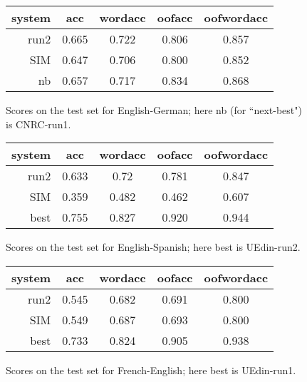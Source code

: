 \documentclass[11pt]{article}
\begin{document}
\begin{figure}[t]
  \begin{center}
  \begin{tabular}{|r|c|c|c|c|}
    \hline
    system & acc      & wordacc  & oofacc & oofwordacc \\
    \hline
    run2  &  0.665 & 0.722  &  0.806  & 0.857 \\
    SIM    &  0.647 & 0.706 & 0.800 & 0.852 \\
    nb     &  0.657   & 0.717   & 0.834 & 0.868    \\
    \hline
  \end{tabular}
  \end{center}
\caption{Scores on the test set for English-German; here nb (for
``next-best") is CNRC-run1.}
\label{fig:theresults-en-de}
\end{figure}

\begin{figure}[t]
  \begin{center}
  \begin{tabular}{|r|c|c|c|c|}
    \hline
    system & acc      & wordacc  & oofacc & oofwordacc \\
    \hline
    run2  &  0.633 & 0.72 & 0.781 & 0.847 \\
    SIM    &  0.359 &  0.482 & 0.462 & 0.607 \\
    best   &  0.755 & 0.827   & 0.920  & 0.944 \\
    \hline
  \end{tabular}
  \end{center}
\caption{Scores on the test set for English-Spanish; here best is UEdin-run2.}
\label{fig:theresults-en-es}
\end{figure}

\begin{figure}[t]
  \begin{center}
  \begin{tabular}{|r|c|c|c|c|}
    \hline
    system & acc      & wordacc  & oofacc & oofwordacc \\
    \hline
    run2  & 0.545  & 0.682 & 0.691 & 0.800 \\
    SIM        &  0.549 & 0.687 & 0.693 & 0.800 \\
    best & 0.733 & 0.824 & 0.905 & 0.938 \\
    \hline
  \end{tabular}
  \end{center}
\caption{Scores on the test set for French-English; here best is UEdin-run1.}
\label{fig:theresults-fr-en}
\end{figure}
\end{document}
